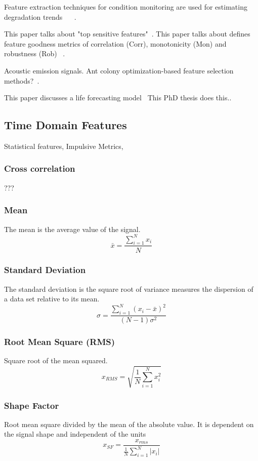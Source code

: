 \documentclass{article}
\begin{document}
Feature extraction techniques for condition monitoring are used for estimating degradation trends ~\cite{caesarendra2017review} ~\cite{adams2017comparison}.

This paper talks about "top sensitive features"~\cite{bleakie2013feature}.
This paper talks about defines feature goodness metrics of correlation (Corr), monotonicity (Mon) and robustness (Rob) ~\cite{zhang2016degradation}.

Acoustic emission signals. Ant colony optimization-based feature selection methods?~\cite{liao2010feature}.

This paper discusses a life forecasting model~\cite{wang2016multiple}
This PhD thesis does this..~\cite{martin2017unsupervised}

\subsection{Time Domain Features} 	
Statistical features, Impulsive Metrics, 
\subsubsection{Cross correlation}
???
\subsubsection{Mean}
The mean is the average value of the signal.
$$ \bar{x} = \frac{\sum^N_{i=1} x_i}{N} $$
\subsubsection{Standard Deviation}  
The standard deviation is the square root of variance measures the dispersion of a data set relative to its mean. 
$$ \sigma =\frac{\sum^N_{i=1}(x_i-\bar{x})^2}{(N-1)\sigma^2} $$
\subsubsection{Root Mean Square (RMS)}
Square root of the mean squared.
$$ x_{RMS} = \sqrt{\frac{1}{N} \sum^N_{i=1}x^2_i} $$
\subsubsection{Shape Factor}
Root mean square divided by the mean of the absolute value. It is dependent on the signal shape and independent of the units
$$ x_{SF} = \frac{ x_{rms} }  {\frac{1}{N}\sum^N_{i=1}|x_i|} $$
\end{document}
